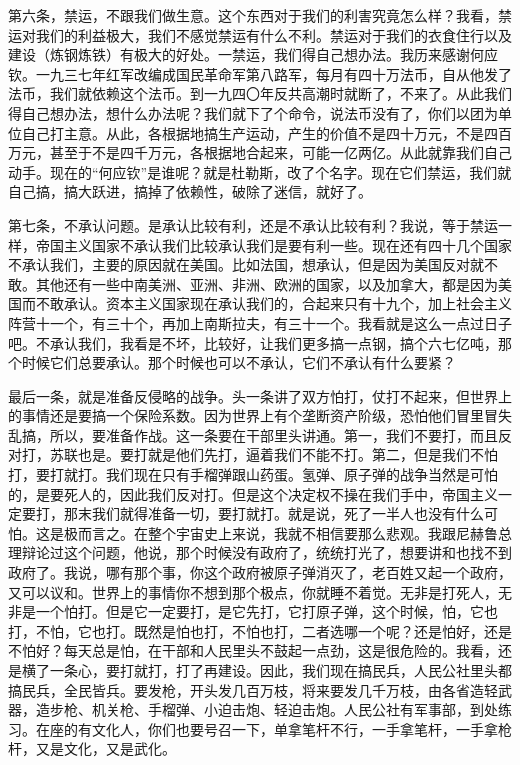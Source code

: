 第六条，禁运，不跟我们做生意。这个东西对于我们的利害究竟怎么样？我看，禁运对我们的利益极大，我们不感觉禁运有什么不利。禁运对于我们的衣食住行以及建设（炼钢炼铁）有极大的好处。一禁运，我们得自己想办法。我历来感谢何应钦。一九三七年红军改编成国民革命军第八路军，每月有四十万法币，自从他发了法币，我们就依赖这个法币。到一九四〇年反共高潮时就断了，不来了。从此我们得自己想办法，想什么办法呢？我们就下了个命令，说法币没有了，你们以团为单位自己打主意。从此，各根据地搞生产运动，产生的价值不是四十万元，不是四百万元，甚至于不是四千万元，各根据地合起来，可能一亿两亿。从此就靠我们自己动手。现在的“何应钦”是谁呢？就是杜勒斯，改了个名字。现在它们禁运，我们就自己搞，搞大跃进，搞掉了依赖性，破除了迷信，就好了。

第七条，不承认问题。是承认比较有利，还是不承认比较有利？我说，等于禁运一样，帝国主义国家不承认我们比较承认我们是要有利一些。现在还有四十几个国家不承认我们，主要的原因就在美国。比如法国，想承认，但是因为美国反对就不敢。其他还有一些中南美洲、亚洲、非洲、欧洲的国家，以及加拿大，都是因为美国而不敢承认。资本主义国家现在承认我们的，合起来只有十九个，加上社会主义阵营十一个，有三十个，再加上南斯拉夫，有三十一个。我看就是这么一点过日子吧。不承认我们，我看是不坏，比较好，让我们更多搞一点钢，搞个六七亿吨，那个时候它们总要承认。那个时候也可以不承认，它们不承认有什么要紧？

最后一条，就是准备反侵略的战争。头一条讲了双方怕打，仗打不起来，但世界上的事情还是要搞一个保险系数。因为世界上有个垄断资产阶级，恐怕他们冒里冒失乱搞，所以，要准备作战。这一条要在干部里头讲通。第一，我们不要打，而且反对打，苏联也是。要打就是他们先打，逼着我们不能不打。第二，但是我们不怕打，要打就打。我们现在只有手榴弹跟山药蛋。氢弹、原子弹的战争当然是可怕的，是要死人的，因此我们反对打。但是这个决定权不操在我们手中，帝国主义一定要打，那末我们就得准备一切，要打就打。就是说，死了一半人也没有什么可怕。这是极而言之。在整个宇宙史上来说，我就不相信要那么悲观。我跟尼赫鲁总理辩论过这个问题，他说，那个时候没有政府了，统统打光了，想要讲和也找不到政府了。我说，哪有那个事，你这个政府被原子弹消灭了，老百姓又起一个政府，又可以议和。世界上的事情你不想到那个极点，你就睡不着觉。无非是打死人，无非是一个怕打。但是它一定要打，是它先打，它打原子弹，这个时候，怕，它也打，不怕，它也打。既然是怕也打，不怕也打，二者选哪一个呢？还是怕好，还是不怕好？每天总是怕，在干部和人民里头不鼓起一点劲，这是很危险的。我看，还是横了一条心，要打就打，打了再建设。因此，我们现在搞民兵，人民公社里头都搞民兵，全民皆兵。要发枪，开头发几百万枝，将来要发几千万枝，由各省造轻武器，造步枪、机关枪、手榴弹、小迫击炮、轻迫击炮。人民公社有军事部，到处练习。在座的有文化人，你们也要号召一下，单拿笔杆不行，一手拿笔杆，一手拿枪杆，又是文化，又是武化。

